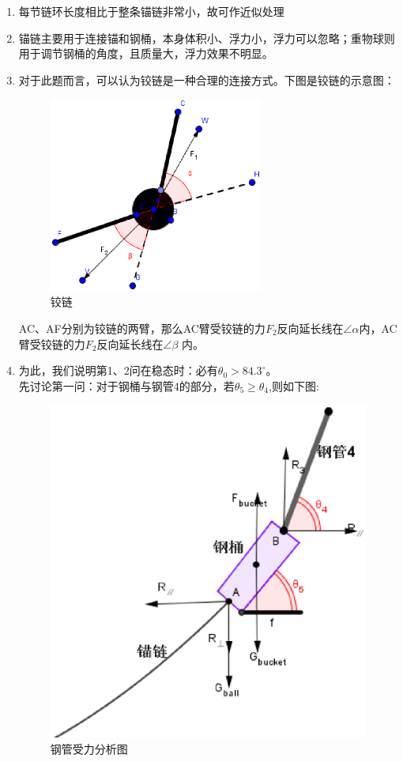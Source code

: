 \documentclass[a4paper,12pt]{ctexart}
\begin{document}
\begin{enumerate}
\item 每节链环长度相比于整条锚链非常小，故可作近似处理
\item 锚链主要用于连接锚和钢桶，本身体积小、浮力小，浮力可以忽略；重物球则用于调节钢桶的角度，且质量大，浮力效果不明显。
\item 对于此题而言，可以认为铰链是一种合理的连接方式。下图是铰链的示意图：

\begin{figure}[H]
\centering
\includegraphics[width= 200pt]{1234.eps}
\caption{铰链}
\end{figure}

AC、AF分别为铰链的两臂，那么AC臂受铰链的力$F_2$反向延长线在$\angle\alpha$内，AC臂受铰链的力$F_2$反向延长线在$\angle\beta$ 内。
\item 为此，我们说明第1、2问在稳态时：必有$\theta_0>84.3^{\circ}$。\\
先讨论第一问：对于钢桶与钢管4的部分，若$\theta_5\ge\theta_4$,则如下图:\\

\begin{figure}[H]
\centering
\includegraphics[width = 300pt]{123.eps}
\caption{钢管受力分析图}
\end{figure}


\end{enumerate}
\end{document}
